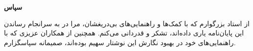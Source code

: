 


\begin{center}
\textbf{سپاس}
\end{center}

از استاد بزرگوارم که با کمک‌ها و راهنمایی‌های بی‌دریغشان، مرا
در به سرانجام رساندن این پایان‌نامه یاری داده‌اند، تشکر و قدردانی می‌کنم.
همچنین از همکاران عزیزی که با راهنمایی‌های خود در بهبود نگارش این نوشتار
سهیم بوده‌اند، صمیمانه سپاسگزارم.

